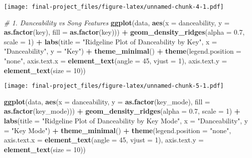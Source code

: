 \documentclass[
]{article}
\newenvironment{Shaded}{\begin{snugshade}}{\end{snugshade}}
\newcommand{\AttributeTok}[1]{\textcolor[rgb]{0.13,0.29,0.53}{#1}}
\newcommand{\CommentTok}[1]{\textcolor[rgb]{0.56,0.35,0.01}{\textit{#1}}}
\newcommand{\DecValTok}[1]{\textcolor[rgb]{0.00,0.00,0.81}{#1}}
\newcommand{\FloatTok}[1]{\textcolor[rgb]{0.00,0.00,0.81}{#1}}
\newcommand{\FunctionTok}[1]{\textcolor[rgb]{0.13,0.29,0.53}{\textbf{#1}}}
\newcommand{\NormalTok}[1]{#1}
\newcommand{\SpecialCharTok}[1]{\textcolor[rgb]{0.81,0.36,0.00}{\textbf{#1}}}
\newcommand{\StringTok}[1]{\textcolor[rgb]{0.31,0.60,0.02}{#1}}
\begin{document}
\texttt{[image: final-project\_files/figure-latex/unnamed-chunk-4-1.pdf]}

\begin{Shaded}
\begin{Highlighting}[]
\CommentTok{\# 1. Danceability vs Song Features}
\FunctionTok{ggplot}\NormalTok{(data, }\FunctionTok{aes}\NormalTok{(}\AttributeTok{x =}\NormalTok{ danceability, }\AttributeTok{y =} \FunctionTok{as.factor}\NormalTok{(key), }\AttributeTok{fill =} \FunctionTok{as.factor}\NormalTok{(key))) }\SpecialCharTok{+}
  \FunctionTok{geom\_density\_ridges}\NormalTok{(}\AttributeTok{alpha =} \FloatTok{0.7}\NormalTok{, }\AttributeTok{scale =} \DecValTok{1}\NormalTok{) }\SpecialCharTok{+}
  \FunctionTok{labs}\NormalTok{(}\AttributeTok{title =} \StringTok{"Ridgeline Plot of Danceability by Key"}\NormalTok{,}
       \AttributeTok{x =} \StringTok{"Danceability"}\NormalTok{,}
       \AttributeTok{y =} \StringTok{"Key"}\NormalTok{) }\SpecialCharTok{+}
  \FunctionTok{theme\_minimal}\NormalTok{() }\SpecialCharTok{+}
  \FunctionTok{theme}\NormalTok{(}\AttributeTok{legend.position =} \StringTok{"none"}\NormalTok{, }
        \AttributeTok{axis.text.x =} \FunctionTok{element\_text}\NormalTok{(}\AttributeTok{angle =} \DecValTok{45}\NormalTok{, }\AttributeTok{vjust =} \DecValTok{1}\NormalTok{),}
        \AttributeTok{axis.text.y =} \FunctionTok{element\_text}\NormalTok{(}\AttributeTok{size =} \DecValTok{10}\NormalTok{))}
\end{Highlighting}
\end{Shaded}

\texttt{[image: final-project\_files/figure-latex/unnamed-chunk-5-1.pdf]}

\begin{Shaded}
\begin{Highlighting}[]
\FunctionTok{ggplot}\NormalTok{(data, }\FunctionTok{aes}\NormalTok{(}\AttributeTok{x =}\NormalTok{ danceability, }\AttributeTok{y =} \FunctionTok{as.factor}\NormalTok{(key\_mode), }\AttributeTok{fill =} \FunctionTok{as.factor}\NormalTok{(key\_mode))) }\SpecialCharTok{+}
  \FunctionTok{geom\_density\_ridges}\NormalTok{(}\AttributeTok{alpha =} \FloatTok{0.7}\NormalTok{, }\AttributeTok{scale =} \DecValTok{1}\NormalTok{) }\SpecialCharTok{+}
  \FunctionTok{labs}\NormalTok{(}\AttributeTok{title =} \StringTok{"Ridgeline Plot of Danceability by Key Mode"}\NormalTok{,}
       \AttributeTok{x =} \StringTok{"Danceability"}\NormalTok{,}
       \AttributeTok{y =} \StringTok{"Key Mode"}\NormalTok{) }\SpecialCharTok{+}
  \FunctionTok{theme\_minimal}\NormalTok{() }\SpecialCharTok{+}
  \FunctionTok{theme}\NormalTok{(}\AttributeTok{legend.position =} \StringTok{"none"}\NormalTok{, }
        \AttributeTok{axis.text.x =} \FunctionTok{element\_text}\NormalTok{(}\AttributeTok{angle =} \DecValTok{45}\NormalTok{, }\AttributeTok{vjust =} \DecValTok{1}\NormalTok{),}
        \AttributeTok{axis.text.y =} \FunctionTok{element\_text}\NormalTok{(}\AttributeTok{size =} \DecValTok{10}\NormalTok{))}
\end{Highlighting}
\end{Shaded}
\end{document}
